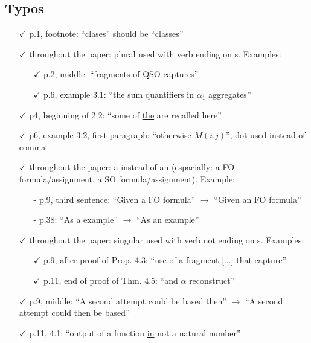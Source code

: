 \documentclass[a4paper]{article}
\begin{document}
\subsection*{Typos}
\begin{itemize}
	\setlength\itemsep{0.5em}
	\item[$\checkmark$] p.1, footnote: ``clases'' should be ``classes''
	\item[$\checkmark$] throughout the paper: plural used with verb ending on s. Examples:
	\begin{itemize}
	\item[$\checkmark$] p.2, middle: ``fragments of QSO captures''
	\item[$\checkmark$] p.6, example 3.1: ``the sum quantifiers in $\alpha_1$ aggregates''
	\end{itemize}
	\item[$\checkmark$] p4, beginning of 2.2: ``some of \underline{the} are recalled here''
	\item[$\checkmark$] p6, example 3.2, first paragraph: ``otherwise $M(i.j)$'', dot used instead of comma
	\item[$\checkmark$] throughout the paper: a instead of an (espacially: a FO formula/assignment, a SO formula/assignment).
	Example:
	\begin{itemize}
		\item[-] p.9, third sentence: ``Given a FO formula'' $\to$ ``Given an FO formula''
	\item[-] p.38: ``As a example'' $\to$ ``As an example''
\end{itemize}
	\item[$\checkmark$] throughout the paper: singular used with verb not ending on s. Examples:
	\begin{itemize}
	\item[$\checkmark$] p.9, after proof of Prop. 4.3: ``use of a fragment [...] that capture''
	\item[$\checkmark$] p.11, end of proof of Thm. 4.5: ``and $\alpha$ reconstruct''
\end{itemize}
	\item[$\checkmark$] p.9, middle: ``A second attempt could be based then'' $\to$ ``A second attempt could then be
	based''
	\item[$\checkmark$] p.11, 4.1: ``output of a function \underline{in} not a natural number''

\end{itemize}
\end{document}
